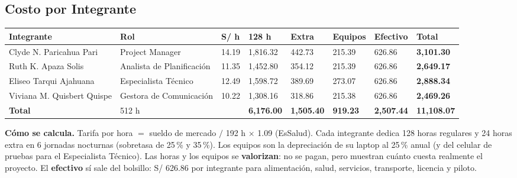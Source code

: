 \documentclass[11pt,a4paper]{article}
\newenvironment{hojah}[1]{\clearpage\begin{landscape}\thispagestyle{horizontal}\section{#1}}{\end{landscape}}
\begin{document}
\begin{hojah}{Costo por Integrante}
\begin{minipage}[c]{14.4cm}
{\begin{tabularx}{\linewidth}{@{}L P{2.3cm} Q{0.8cm} Q{1.4cm} Q{1.3cm} Q{1.2cm} Q{1.3cm} Q{1.5cm}@{}}
\toprule
{}
\textbf{Integrante} & \textbf{Rol} & \textbf{S/ h} & \textbf{128 h} & \textbf{Extra} & \textbf{Equipos} & \textbf{Efectivo} & \textbf{Total} \\
\midrule
Clyde N. Paricahua Pari & Project Manager & 14.19 & 1,816.32 & 442.73 & 215.39 & 626.86 & \textbf{3,101.30} \\
Ruth K. Apaza Solis & Analista de Planificación & 11.35 & 1,452.80 & 354.12 & 215.39 & 626.86 & \textbf{2,649.17} \\
Eliseo Tarqui Ajahuana & Especialista Técnico & 12.49 & 1,598.72 & 389.69 & 273.07 & 626.86 & \textbf{2,888.34} \\
Viviana M. Quisbert Quispe & Gestora de Comunicación & 10.22 & 1,308.16 & 318.86 & 215.38 & 626.86 & \textbf{2,469.26} \\
\midrule
{}\textbf{Total} & 512 h & & \textbf{6,176.00} & \textbf{1,505.40} & \textbf{919.23} & \textbf{2,507.44} & \textbf{11,108.07} \\
\bottomrule
\end{tabularx}
}

\vspace{0.25cm}
{\normalsize\noindent\textbf{Cómo se calcula.} Tarifa por hora $=$ sueldo de mercado $/$ 192 h $\times$ 1.09 (EsSalud). Cada integrante dedica 128 horas regulares y 24 horas extra en 6 jornadas nocturnas (sobretasa de 25\,\% y 35\,\%). Los equipos son la depreciación de su laptop al 25\,\% anual (y del celular de pruebas para el Especialista Técnico). Las horas y los equipos se \textbf{valorizan}: no se pagan, pero muestran cuánto cuesta realmente el proyecto. El \textbf{efectivo} sí sale del bolsillo: S/ 626.86 por integrante para alimentación, salud, servicios, transporte, licencia y piloto.}
\end{minipage}
\end{hojah}
\end{document}
